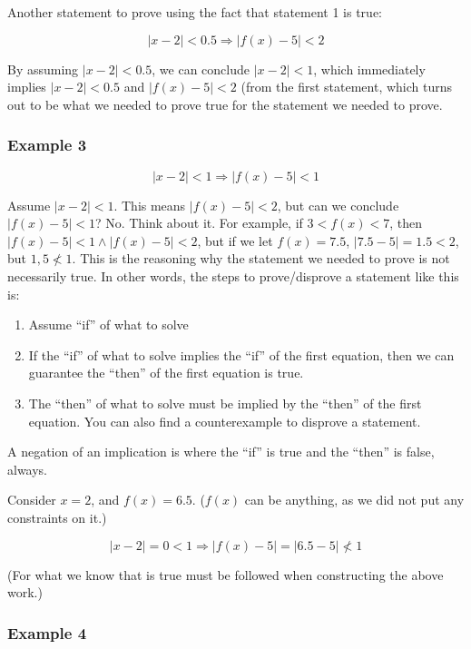 \documentclass[
]{article}
\newcounter{example}
\begin{document}
Another statement to prove using the fact that statement 1 is true:

$$|x - 2| < 0.5 \Rightarrow \left| f(x) - 5 \right| < 2$$

By assuming $|x - 2| < 0.5$, we can conclude $|x - 2| < 1$, which
immediately implies $|x - 2| < 0.5$ and
$\left| f(x) - 5 \right| < 2$ (from the first statement, which turns
out to be what we needed to prove true for the statement we needed to
prove.


\subsubsection{Example 3}

$$|x - 2| < 1 \Rightarrow \left| f(x) - 5 \right| < 1$$

Assume $|x - 2| < 1$. This means $\left| f(x) - 5 \right| < 2$, but
can we conclude $|f(x) - 5| < 1$? No. Think about it. For example, if
$3 < f(x) < 7$, then
$\left| f(x) - 5 \right| < 1 \land \left| f(x) - 5 \right| < 2$, but
if we let $f(x) = 7.5$, $|7.5 - 5| = 1.5 < 2$, but $1,5 \nless 1$.
This is the reasoning why the statement we needed to prove is not
necessarily true. In other words, the steps to prove/disprove a
statement like this is:

\begin{enumerate}
\def\labelenumi{\arabic{enumi}.}
\item
  Assume ``if'' of what to solve
\item
  If the ``if'' of what to solve implies the ``if'' of the first
  equation, then we can guarantee the ``then'' of the first equation is
  true.
\item
  The ``then'' of what to solve must be implied by the ``then'' of the
  first equation. You can also find a counterexample to disprove a
  statement.
\end{enumerate}

A negation of an implication is where the ``if'' is true and the
``then'' is false, always.

Consider $x = 2$, and $f(x) = 6.5$. ($f(x)$ can be anything, as we
did not put any constraints on it.)

$$|x - 2| = 0 < 1 \Rightarrow \left| f(x) - 5 \right| = |6.5 - 5| \nless 1$$

(For what we know that is true must be followed when constructing the
above work.)


\subsubsection{Example 4}
\end{document}
